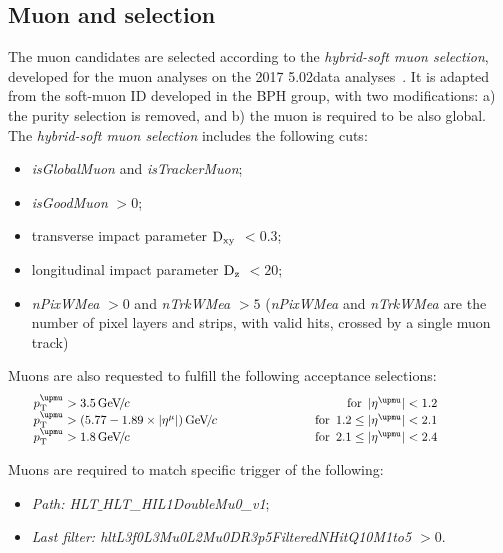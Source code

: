 \subsection{Muon and \Jpsi selection}
\label{sec:muonsel}

The muon candidates are selected according to the {\it{hybrid-soft muon selection}}, developed for the muon analyses on the 2017 5.02\TeV data analyses~\cite{AN-16-048}. It is adapted from the soft-muon ID developed in the BPH group, with two modifications: a) the purity selection is removed, and b) the muon is required to be also global. 
The {\it{hybrid-soft muon selection}} includes the following cuts:
\begin{itemize}
\item \textit{isGlobalMuon} and \textit{isTrackerMuon};
\item \textit{isGoodMuon} $> 0$;
\item transverse impact parameter \textit{$\rm D_{xy}$} $< 0.3$;
\item longitudinal impact parameter \textit{$\rm D_{z}$} $< 20$;
\item \textit{nPixWMea} $> 0$ and \textit{nTrkWMea} $> 5$ (\textit{nPixWMea} and \textit{nTrkWMea} are  the number of pixel layers and strips, with valid hits, crossed by a single muon track)
\end{itemize}

Muons are also requested to fulfill the following acceptance selections:
\begin{equation}
\centering
\setlength\arraycolsep{20pt}
\begin{array}{l c r r}
\pt^{\PGm}>3.5\GeVc & & \text{for}\enspace \abs{\eta^{\PGm}}<1.2 & \\
\pt^{\PGm}>(5.77 - 1.89\times\abs{\eta^{\mu}})\GeVc & &  \text{for}\enspace 1.2\le\abs{\eta^{\PGm}}<2.1 &\\
\pt^{\PGm}>1.8\GeVc & & \text{for}\enspace 2.1\le\abs{\eta^{\PGm}}<2.4 &
\end{array}
\label{eq:SingleMuonAccCuts}
\end{equation}

Muons are required to match specific trigger of the following:
\begin{itemize}
\item \textit{Path: HLT$\_$HLT\_HIL1DoubleMu0\_v1}; \\
\item \textit{Last filter: hltL3f0L3Mu0L2Mu0DR3p5FilteredNHitQ10M1to5 $> 0$}.
\end{itemize}

